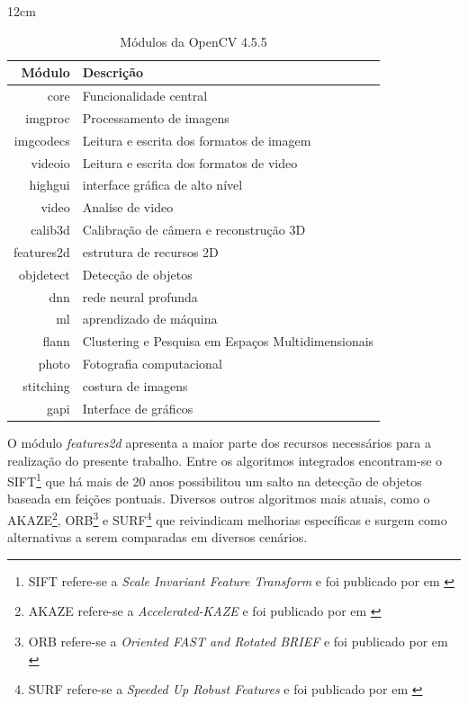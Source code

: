 \begin{table}[!ht]{12cm}
  \caption{Módulos da OpenCV 4.5.5}\label{modulos}
  \hfill
  \begin{tabular}{r|l}
    \hline
      Módulo & Descrição \\
    \hline
      core & Funcionalidade central \\
      imgproc & Processamento de imagens \\
      imgcodecs & Leitura e escrita dos formatos de imagem  \\
      videoio & Leitura e escrita dos formatos de video \\
      highgui & interface gráfica de alto nível \\
      video & Analise de video \\
      calib3d & Calibração de câmera e reconstrução 3D \\
      features2d & estrutura de recursos 2D \\
      objdetect & Detecção de objetos \\
      dnn & rede neural profunda \\
      ml & aprendizado de máquina \\
      flann & Clustering e Pesquisa em Espaços Multidimensionais \\
      photo & Fotografia computacional \\
      stitching & costura de imagens \\
      gapi & Interface de gráficos \\
    \hline
  \end{tabular}
  \hfill
\end{table}

O módulo \textit{features2d} apresenta a maior parte dos recursos necessários para a realização do presente trabalho. Entre os algoritmos integrados encontram-se o 
SIFT\footnote{SIFT refere-se a \textit{Scale Invariant Feature Transform} e foi publicado por  em \citeyear{SIFT1999}} 
que há mais de 20 anos possibilitou um salto na detecção de objetos baseada em feições pontuais. Diversos outros algoritmos mais atuais, como o
AKAZE\footnote{AKAZE refere-se a \textit{Accelerated-KAZE} e foi publicado por  em \citeyear{AKAZE}}, 
ORB\footnote{ORB refere-se a \textit{Oriented FAST and Rotated BRIEF} e foi publicado por  em \citeyear{ORB}} e 
SURF\footnote{SURF refere-se a \textit{Speeded Up Robust Features} e foi publicado por  em \citeyear{SURF}} 
que reivindicam melhorias específicas e surgem como alternativas a serem comparadas em diversos cenários.

